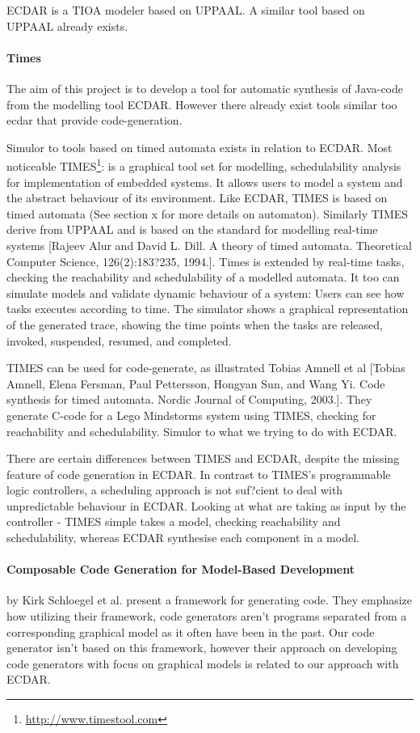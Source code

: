 ECDAR is a TIOA modeler based on UPPAAL. A similar tool based on UPPAAL already
exists.

\paragraph{Times}
The aim of this project is to develop a tool for automatic synthesis of Java-code from the modelling tool ECDAR. However there already exist tools similar too ecdar that provide code-generation.

Simulor to tools based on timed automata exists in relation to ECDAR. Most noticeable TIMES\footnote{\url{http://www.timestool.com}}: is a graphical tool set for modelling, schedulability analysis for implementation of embedded systems. It allows users to model a system and the abstract behaviour of its environment. 
Like ECDAR, TIMES is based on timed automata (See section x for more details on automaton). Similarly TIMES derive from UPPAAL and is based on the standard for modelling real-time systems [Rajeev Alur and David L. Dill. A theory of timed automata. Theoretical Computer
Science, 126(2):183?235, 1994.].
Times is extended by real-time tasks, checking the reachability and schedulability of a modelled automata. It too can simulate models and validate dynamic behaviour of a system: Users can see how tasks executes according to time. The simulator shows a graphical representation of the generated trace, showing the time points when the tasks are released, invoked, suspended, resumed, and completed.

TIMES can be used for code-generate, as illustrated Tobias Amnell et al [Tobias Amnell, Elena Fersman, Paul Pettersson, Hongyan Sun, and Wang Yi. Code
synthesis for timed automata. Nordic Journal of Computing, 2003.]. They generate C-code for a Lego Mindstorms system using TIMES, checking for reachability and schedulability. Simulor to what we trying to do with ECDAR. 



There are certain differences between TIMES and ECDAR, despite the missing feature of code generation in ECDAR. In contrast to TIMES's programmable logic controllers, a scheduling approach is not suf?cient to deal with unpredictable behaviour in ECDAR.
Looking at what are taking as input by the controller - TIMES simple takes a model, checking reachability and schedulability, whereas ECDAR synthesise each component in a model.



\paragraph{Composable Code Generation for Model-Based Development}
by Kirk Schloegel et al. present a framework for generating
code\cite{composable-code-generation}. They emphasize how utilizing their
framework, code generators aren't programs separated from a corresponding
graphical model as it often have been in the past. Our code generator isn't
based on this framework, however their approach on developing code generators
with focus on graphical models is related to our approach with ECDAR.


